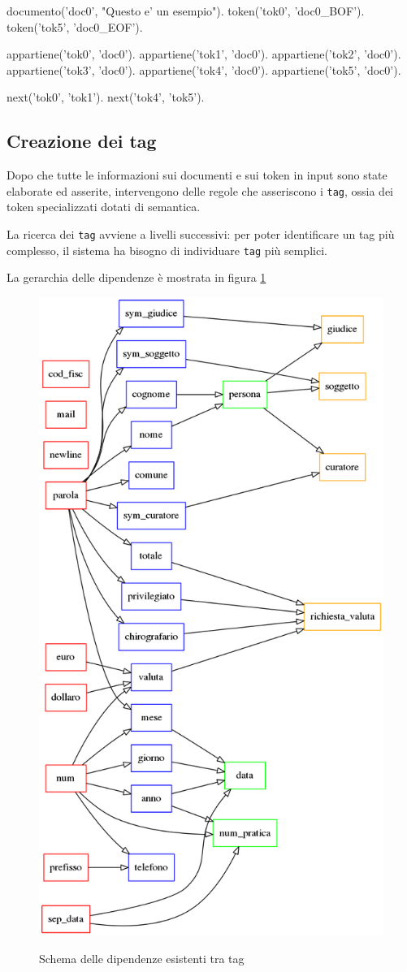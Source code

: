 \begin{prologcode}
documento('doc0', "Questo e' un esempio").
token('tok0', 'doc0_BOF').
token('tok5', 'doc0_EOF').

appartiene('tok0', 'doc0').
appartiene('tok1', 'doc0').
appartiene('tok2', 'doc0').
appartiene('tok3', 'doc0').
appartiene('tok4', 'doc0').
appartiene('tok5', 'doc0').

next('tok0', 'tok1').
next('tok4', 'tok5').
\end{prologcode}

\subsection{Creazione dei tag}
Dopo che tutte le informazioni sui documenti e sui token in input sono state elaborate ed asserite, intervengono delle regole che asseriscono i \verb|tag|, ossia dei token specializzati dotati di semantica.

La ricerca dei \verb|tag| avviene a livelli successivi:
per poter identificare un tag più complesso, il sistema ha bisogno di individuare \verb|tag| più semplici.

La gerarchia delle dipendenze è mostrata in figura \ref{fig:dipendenze}


\begin{figure}[H]
\centering
\includegraphics[width=.8\textwidth]{img/dipendenze.png}
\label{fig:dipendenze}
\caption{Schema delle dipendenze esistenti tra tag}
\end{figure}

